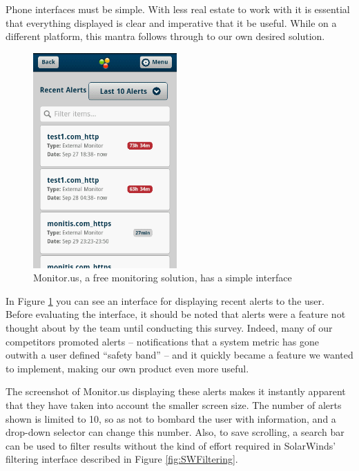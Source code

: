 \documentclass{l3proj}
\begin{document}
Phone interfaces must be simple. With less real estate to work with it is essential that everything displayed is clear and imperative that it be useful. While on a different platform, this mantra follows through to our own desired solution.

\begin{figure}[H]
\centering
\includegraphics[width=55mm]
{Competitors/MonitorUS_iPhoneAlerts.png}
\caption{Monitor.us, a free monitoring solution, has a simple interface}
\label{fig:MUSiPhone1}
\end{figure}

In Figure \ref{fig:MUSiPhone1} you can see an interface for displaying recent alerts to the user. Before evaluating the interface, it should be noted that alerts were a feature not thought about by the team until conducting this survey. Indeed, many of our competitors promoted alerts -- notifications that a system metric has gone outwith a user defined ``safety band'' -- and it quickly became a feature we wanted to implement, making our own product even more useful.

The screenshot of Monitor.us displaying these alerts makes it instantly apparent that they have taken into account the smaller screen size. The number of alerts shown is limited to 10, so as not to bombard the user with information, and a drop-down selector can change this number. Also, to save scrolling, a search bar can be used to filter results without the kind of effort required in SolarWinds' filtering interface described in Figure \ref{fig:SWFiltering}.
\end{document}
